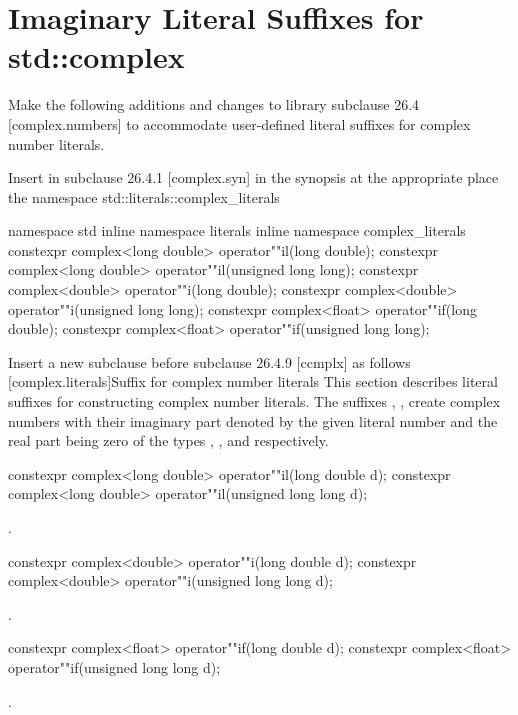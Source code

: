 \documentclass[ebook,11pt,article]{memoir}
\begin{document}

\section{Imaginary Literal Suffixes for std::complex}
Make the following additions and changes to library subclause 26.4 [complex.numbers] to accommodate user-defined literal suffixes for complex number literals.

Insert in subclause 26.4.1 [complex.syn] in the synopsis at the appropriate place the namespace std::literals::complex_literals
\begin{codeblock}
namespace std{
inline namespace literals{
inline namespace complex_literals{
constexpr complex<long double> operator""il(long double);
constexpr complex<long double> operator""il(unsigned long long);
constexpr complex<double> operator""i(long double);
constexpr complex<double> operator""i(unsigned long long);
constexpr complex<float> operator""if(long double);
constexpr complex<float> operator""if(unsigned long long);
}}}
\end{codeblock}

Insert a new subclause before subclause 26.4.9 [ccmplx] as follows
[complex.literals]{Suffix for complex number literals}
\pnum
This section describes literal suffixes for constructing complex number literals. The suffixes , ,  create complex numbers with their imaginary part denoted by the given literal number and the real part being zero of the types , , and  respectively. 

\begin{itemdecl}
constexpr complex<long double> operator""il(long double d);
constexpr complex<long double> operator""il(unsigned long long d);
\end{itemdecl}

\begin{itemdescr}
\pnum
\returns
{}.
\end{itemdescr}

\begin{itemdecl}
constexpr complex<double> operator""i(long double d);
constexpr complex<double> operator""i(unsigned long long d);
\end{itemdecl}

\begin{itemdescr}
\pnum
\returns
{}.
\end{itemdescr}

\begin{itemdecl}
constexpr complex<float> operator""if(long double d);
constexpr complex<float> operator""if(unsigned long long d);
\end{itemdecl}

\begin{itemdescr}
\pnum
\returns
{}.
\end{itemdescr}
\end{document}
